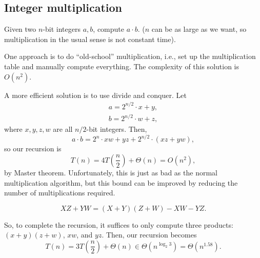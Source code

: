 \subsection{Integer multiplication}

Given two $n$-bit integers $a, b$, compute $a\cdot b$. ($n$ can be as large as we want, so multiplication in the usual sense is not constant time). 

\hrulebar

One approach is to do ``old-school'' multiplication, i.e., set up the multiplication table and manually compute everything. The complexity of this solution is $O(n^2)$. 

A more efficient solution is to use divide and conquer. Let 
\begin{align*}
    a = 2^{n/2}\cdot x + y,\\
    b = 2^{n/2}\cdot w + z,
\end{align*}
where $x,y,z,w$ are all $n/2$-bit integers. Then, 
\[a\cdot b = 2^n\cdot xw + yz + 2^{n/2}\cdot (xz+yw),\]
so our recursion is 
\[T(n) = 4T\left(\frac{n}{2}\right) + \Theta(n) = O(n^2),\]
by Master theorem. Unfortunately, this is just as bad as the normal multiplication algorithm, but this bound can be improved by reducing the number of multiplications required.

\begin{theorem}
\[XZ + YW = (X+Y)(Z+W) - XW - YZ.\]
\end{theorem}

So, to complete the recursion, it suffices to only compute three products: $(x+y)(z+w)$, $xw$, and $yz$. Then, our recursion becomes 
\[T(n) = 3T\left(\frac{n}{2}\right) + \Theta(n) \in \Theta(n^{\log_2 3}) = \Theta(n^{1.58}).\]